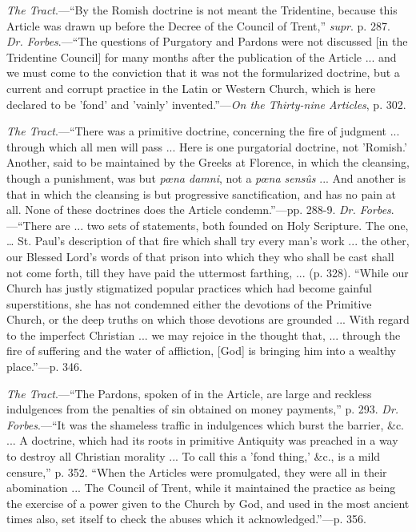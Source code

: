 \emph{The Tract}.—``By the Romish doctrine is not meant the
Tridentine, because this Article was drawn up before the Decree of the
Council of Trent,'' \emph{supr}. p. 287.
\emph{Dr. Forbes}.—``The questions of Purgatory and Pardons were
not discussed [in the Tridentine Council] for many months after the
publication of the Article ... and we must come to the conviction that
it was not the formularized doctrine, but a current and corrupt
practice in the Latin or Western Church, which is here declared to be
'fond' and 'vainly' invented.''—\emph{On the Thirty-nine Articles},
p. 302.


\emph{The Tract}.—``There was a primitive doctrine, concerning
the fire of judgment ... through which all men will pass ... Here is
one purgatorial doctrine, not 'Romish.' Another, said to be maintained
by the Greeks at Florence, in which the cleansing, though a
punishment, was but \emph{pœna damni}, not a \emph{pœna sensûs} ...
And another is that in which the cleansing is but progressive
sanctification, and has no pain at all. None of these doctrines does
the Article condemn.''—pp. 288-9.
\emph{Dr. Forbes}.—``There are ... two sets of statements, both
founded on Holy Scripture. The one, … St. Paul's description of that
fire which shall try every man's work ... the other, our Blessed Lord's
words of that prison into which they who shall be cast shall not come
forth, till they have paid the uttermost farthing, ... (p. 328).
``While our Church has justly stigmatized popular practices which
had become gainful superstitions, she has not condemned either the
devotions of the Primitive Church, or the deep truths on which those
devotions are grounded ... With regard to the imperfect Christian ...
we may rejoice in the thought that, ... through the fire of suffering
and the water of affliction, [God] is bringing him into a wealthy
place.''—p. 346.


\emph{The Tract}.—``The Pardons, spoken of in the Article, are
large and reckless indulgences from the penalties of sin obtained on
money payments,'' p. 293.
\emph{Dr. Forbes}.—``It was the shameless traffic in indulgences
which burst the barrier, \&c. ... A doctrine, which had its roots
in primitive Antiquity was preached in a way to destroy all Christian
morality ... To call this a 'fond thing,' \&c., is a mild
censure,'' p. 352. ``When the Articles were promulgated, they
were all in their abomination ... The Council of Trent, while it
maintained the practice as being the exercise of a power given to the
Church by God, and used in the most ancient times also, set itself to
check the abuses which it acknowledged.''—p. 356.


